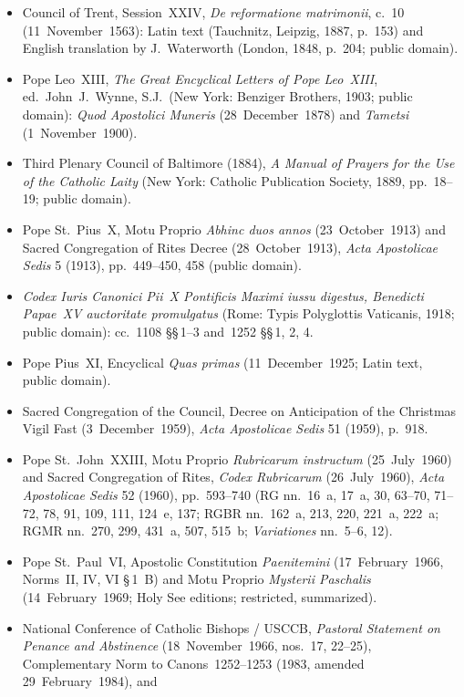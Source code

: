 \begin{itemize}
\item Council of Trent, Session~XXIV, \textit{De reformatione matrimonii}, c.~10
(11~November~1563): Latin text (Tauchnitz, Leipzig, 1887, p.~153) and English
translation by J.~Waterworth (London, 1848, p.~204; public domain).
\item Pope Leo~XIII, \textit{The Great Encyclical Letters of Pope Leo~XIII},
ed.\ John~J.~Wynne, S.J.\ (New York: Benziger Brothers, 1903; public domain):
\textit{Quod Apostolici Muneris} (28~December~1878) and \textit{Tametsi}
(1~November~1900).
\item Third Plenary Council of Baltimore (1884), \textit{A Manual of Prayers for
the Use of the Catholic Laity} (New York: Catholic Publication Society, 1889,
pp.~18--19; public domain).
\item Pope St.~Pius~X, Motu Proprio \textit{Abhinc duos annos}
(23~October~1913) and Sacred Congregation of Rites Decree (28~October~1913),
\textit{Acta Apostolicae Sedis} 5 (1913), pp.~449--450, 458 (public domain).
\item \textit{Codex Iuris Canonici Pii~X Pontificis Maximi iussu digestus,
Benedicti Papae~XV auctoritate promulgatus} (Rome: Typis Polyglottis Vaticanis,
1918; public domain): cc.~1108 \S\S\,1--3 and~1252 \S\S\,1, 2, 4.
\item Pope Pius~XI, Encyclical \textit{Quas primas} (11~December~1925; Latin
text, public domain).
\item Sacred Congregation of the Council, Decree on Anticipation of the
Christmas Vigil Fast (3~December~1959), \textit{Acta Apostolicae Sedis} 51
(1959), p.~918.
\item Pope St.~John~XXIII, Motu Proprio \textit{Rubricarum instructum}
(25~July~1960) and Sacred Congregation of Rites, \textit{Codex Rubricarum}
(26~July~1960), \textit{Acta Apostolicae Sedis} 52 (1960), pp.~593--740
(RG nn.~16~a, 17~a, 30, 63--70, 71--72, 78, 91, 109, 111, 124~e, 137; RGBR
nn.~162~a, 213, 220, 221~a, 222~a; RGMR nn.~270, 299, 431~a, 507, 515~b;
\textit{Variationes} nn.~5--6, 12).
\item Pope St.~Paul~VI, Apostolic Constitution \textit{Paenitemini}
(17~February~1966, Norms~II, IV, VI \S\,1~B) and Motu Proprio \textit{Mysterii
Paschalis} (14~February~1969; Holy See editions; restricted, summarized).
\item National Conference of Catholic Bishops / USCCB, \textit{Pastoral
Statement on Penance and Abstinence} (18~November~1966, nos.~17, 22--25),
Complementary Norm to Canons~1252--1253 (1983, amended 29~February~1984), and

\end{itemize}
